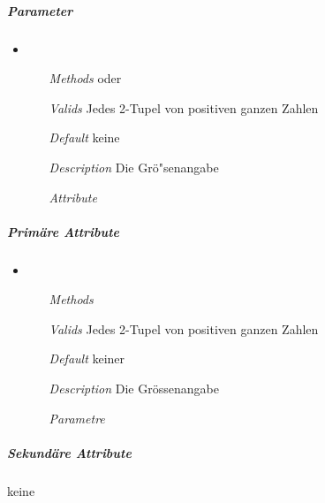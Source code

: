 
\subparagraph{Parameter}
\begin{itemize}
\item {}
\begin{enumerate}
\item[\textit{Methods}]
 oder 
\item[\textit{Valids}] Jedes 2-Tupel von positiven ganzen Zahlen
\item[\textit{Default}] keine
\item[\textit{Description}] Die Gr\"o"senangabe
\item[\textit{Attribute}] 
\end{enumerate}

\end{itemize}


\newpage

\subparagraph{Prim\"are Attribute}
\begin{itemize}
\item {}
\begin{enumerate}
\item[\textit{Methods}]
\item[\textit{Valids}] Jedes 2-Tupel von positiven ganzen Zahlen
\item[\textit{Default}] keiner
\item[\textit{Description}] Die Gr\"ossenangabe
\item[\textit{Parametre}] 
\end{enumerate}

\end{itemize}


\newpage

\subparagraph{Sekund\"are Attribute}
keine


\newpage

